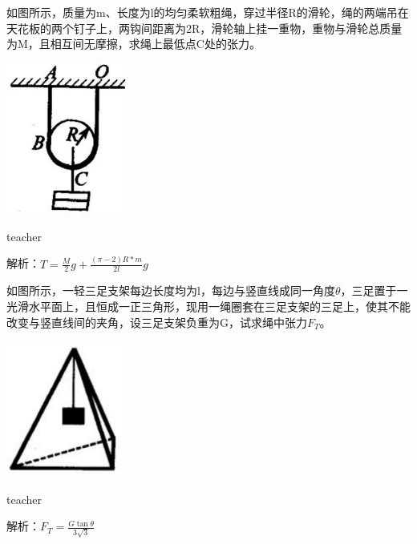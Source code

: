 \begin{example}
	如图所示，质量为m、长度为l的均匀柔软粗绳，穿过半径R的滑轮，绳的两端吊在天花板的两个钉子上，两钩间距离为2R，滑轮轴上挂一重物，重物与滑轮总质量为M，且相互间无摩擦，求绳上最低点C处的张力。
\begin{flushright}
\includegraphics[width = 0.3\textwidth]{images/smallAna-7.pdf} 
\end{flushright}
\begin{taggedblock}{teacher}

解析：$T=\frac{M}{2}g+\frac{(\pi-2)R*m}{2l}g$
\end{taggedblock}
\end{example}


\begin{example}
	如图所示，一轻三足支架每边长度均为l，每边与竖直线成同一角度$\theta$，三足置于一光滑水平面上，且恒成一正三角形，现用一绳圈套在三足支架的三足上，使其不能改变与竖直线间的夹角，设三足支架负重为G，试求绳中张力$F_T$。

\begin{flushright}
\includegraphics[width = 0.3\textwidth]{images/smallAna-8.pdf} 
\end{flushright}
\begin{taggedblock}{teacher}

解析：$F_T=\frac{G\tan\theta}{3\sqrt{3}}$
\end{taggedblock}
\end{example}

